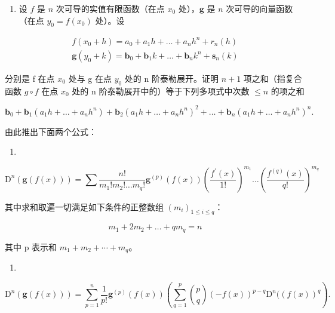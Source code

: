 \begin{enumerate}
\def\labelenumi{\arabic{enumi})}
\setcounter{enumi}{6}
\tightlist
\item
  设 \(f\) 是 \(n\) 次可导的实值有限函数（在点 \(x_0\) 处），\(\mathbf{g}\) 是 \(n\) 次可导的向量函数（在点 \(y_0 = f(x_0)\) 处）。设
\end{enumerate}

\[
\begin{array}{l} f (x _ {0} + h) = a _ {0} + a _ {1} h + \dots + a _ {n} h ^ {n} + r _ {n} (h) \\ \mathbf {g} (y _ {0} + k) = \mathbf {b} _ {0} + \mathbf {b} _ {1} k + \dots + \mathbf {b} _ {n} k ^ {n} + \mathbf {s} _ {n} (k) \end{array}
\]

分别是 f 在点 \(x_{0}\) 处与 g 在点 \(y_{0}\) 处的 n 阶泰勒展开。证明 \(n+1\) 项之和（指复合函数 \(g \circ f\) 在点 \(x_{0}\) 处的 n 阶泰勒展开中的）等于下列多项式中次数 \(\leqslant n\) 的项之和

\[
\mathbf {b} _ {0} + \mathbf {b} _ {1} (a _ {1} h + \dots + a _ {n} h ^ {n}) + \mathbf {b} _ {2} (a _ {1} h + \dots + a _ {n} h ^ {n}) ^ {2} + \dots + \mathbf {b} _ {n} (a _ {1} h + \dots + a _ {n} h ^ {n}) ^ {n}.
\]

由此推出下面两个公式：

\begin{enumerate}
\def\labelenumi{\alph{enumi})}
\tightlist
\item
\end{enumerate}

\[
\mathrm{D} ^ {n} (\mathbf {g} (f (x))) = \sum \frac {n !}{m _ {1} ! m _ {2} ! \dots m _ {q} !} \mathbf {g} ^ {(p)} (f (x)) \left(\frac {f ^ {\prime} (x)}{1 !}\right) ^ {m _ {1}} \dots \left(\frac {f ^ {(q)} (x)}{q !}\right) ^ {m _ {q}}
\]

其中求和取遍一切满足如下条件的正整数组 \((m_{i})_{1\leqslant i\leqslant q}\)：

\[
m _ {1} + 2 m _ {2} + \dots + q m _ {q} = n
\]

其中 p 表示和 \(m_{1} + m_{2} + \cdots + m_{q}\)。

\begin{enumerate}
\def\labelenumi{\alph{enumi})}
\setcounter{enumi}{1}
\tightlist
\item
\end{enumerate}

\[
\mathrm{D} ^ {n} (\mathbf {g} (f (x))) = \sum_ {p = 1} ^ {n} \frac {1}{p !}   \mathbf {g} ^ {(p)} (f (x)) \left(\sum_ {q = 1} ^ {p} \binom {p} {q} (- f (x)) ^ {p - q}   \mathrm{D} ^ {n} ((f (x)) ^ {q}\right).
\]

